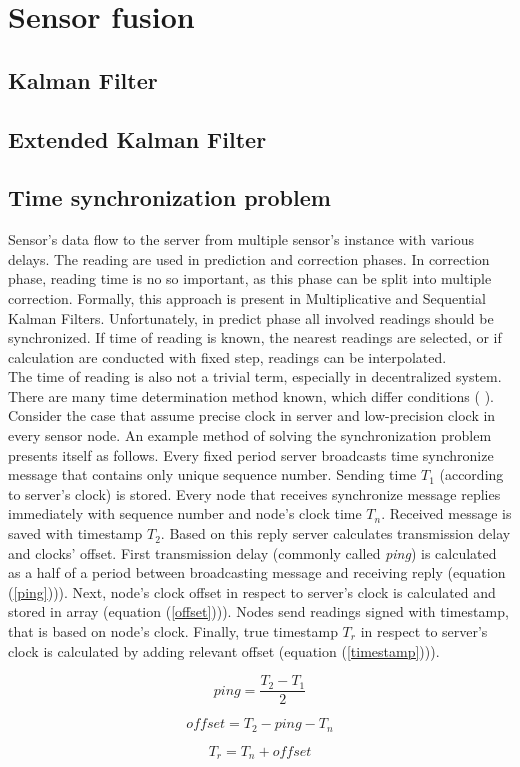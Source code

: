 \chapter{Sensor fusion}



\section{Kalman Filter}

\section{Extended Kalman Filter}

\section{Time synchronization problem}

Sensor's data flow to the server from multiple sensor's instance with various delays. The reading are used in prediction and correction phases. In correction phase, reading time is no so important, as this phase can be split into multiple correction. Formally, this approach is present in Multiplicative and Sequential Kalman Filters. Unfortunately, in predict phase all involved readings should be synchronized. If time of reading is known, the nearest readings are selected, or if calculation are conducted with fixed step, readings can be interpolated.\\

The time of reading is also not a trivial term, especially in decentralized system. There are many time determination method known, which differ conditions (\cite{time_sync} \cite{time_sync2}). Consider the case that assume precise clock in server and low-precision clock in every sensor node. An example method of solving the synchronization problem presents itself as follows. Every fixed period server broadcasts time synchronize message that contains only unique sequence number. Sending time $T_1$ (according to server's clock) is stored. Every node that receives synchronize message replies immediately with sequence number and node's clock time $T_n$. Received message is saved with timestamp $T_2$. Based on this reply server calculates transmission delay and clocks' offset. First transmission delay (commonly called \textit{ping}) is calculated as a half of a period between broadcasting message and receiving reply (equation (\ref{ping}))). Next, node's clock offset in respect to server's clock is calculated and stored in array (equation (\ref{offset}))). Nodes send readings signed with timestamp, that is based on node's clock. Finally, true timestamp $T_r$ in respect to server's clock is calculated by adding relevant offset (equation (\ref{timestamp}))).

\begin{equation}
	ping = \frac{T_2 - T_1}{2}
	\label{ping}
\end{equation}

\begin{equation}
	offset = T_2 - ping - T_n
	\label{offset}
\end{equation}

\begin{equation}
	T_r = T_n + offset
	\label{timestamp}
\end{equation}